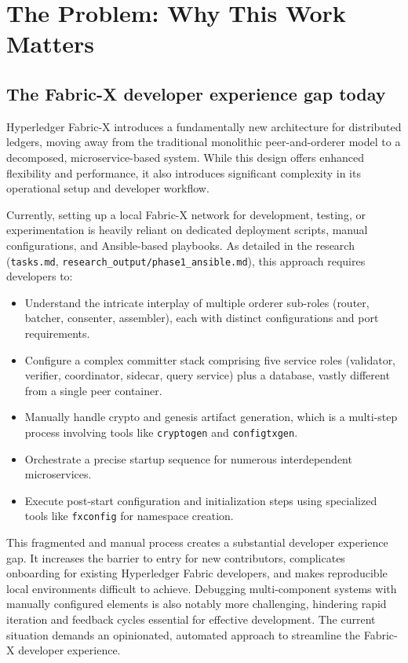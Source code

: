 \section{The Problem: Why This Work Matters}

\subsection{The Fabric-X developer experience gap today}

Hyperledger Fabric-X introduces a fundamentally new architecture for distributed ledgers, moving away from the traditional monolithic peer-and-orderer model to a decomposed, microservice-based system. While this design offers enhanced flexibility and performance, it also introduces significant complexity in its operational setup and developer workflow.

Currently, setting up a local Fabric-X network for development, testing, or experimentation is heavily reliant on dedicated deployment scripts, manual configurations, and Ansible-based playbooks. As detailed in the research (\texttt{tasks.md}, \texttt{research\_output/phase1\_ansible.md}), this approach requires developers to:
\begin{itemize}[leftmargin=*]
    \item Understand the intricate interplay of multiple orderer sub-roles (router, batcher, consenter, assembler), each with distinct configurations and port requirements.
    \item Configure a complex committer stack comprising five service roles (validator, verifier, coordinator, sidecar, query service) plus a database, vastly different from a single peer container.
    \item Manually handle crypto and genesis artifact generation, which is a multi-step process involving tools like \texttt{cryptogen} and \texttt{configtxgen}.
    \item Orchestrate a precise startup sequence for numerous interdependent microservices.
    \item Execute post-start configuration and initialization steps using specialized tools like \texttt{fxconfig} for namespace creation.
\end{itemize}
This fragmented and manual process creates a substantial developer experience gap. It increases the barrier to entry for new contributors, complicates onboarding for existing Hyperledger Fabric developers, and makes reproducible local environments difficult to achieve. Debugging multi-component systems with manually configured elements is also notably more challenging, hindering rapid iteration and feedback cycles essential for effective development. The current situation demands an opinionated, automated approach to streamline the Fabric-X developer experience.

